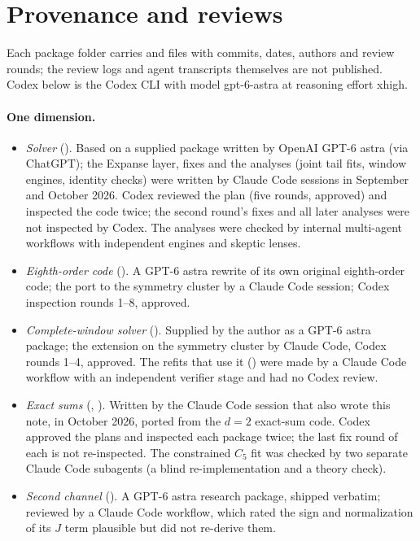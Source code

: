 \section{Provenance and reviews}\label{htp:sec:provenance}
Each package folder carries  and  files with commits, dates, authors and review rounds;
the review logs and agent transcripts themselves are not published. Codex below is the Codex CLI with model
gpt-6-astra at reasoning effort xhigh.

\paragraph{One dimension.}
\begin{itemize}
\item \emph{Solver} (). Based on a supplied package written by OpenAI GPT-6 astra (via
 ChatGPT); the Expanse layer, fixes and the analyses (joint tail fits, window engines, identity checks) were written by
 Claude Code sessions in September and October 2026. Codex reviewed the plan (five rounds, approved) and inspected the
 code twice; the second round's fixes and all later analyses were not inspected by Codex. The analyses were checked by
 internal multi-agent workflows with independent engines and skeptic lenses.
\item \emph{Eighth-order code} (). A GPT-6 astra rewrite of its own original eighth-order code; the
 port to the symmetry cluster by a Claude Code session; Codex inspection rounds 1--8, approved.
\item \emph{Complete-window solver} (). Supplied by the author as a GPT-6 astra
 package; the extension on the symmetry cluster by Claude Code, Codex rounds 1--4, approved. The refits that use it
 () were made by a Claude Code workflow with an independent verifier stage and had no Codex
 review.
\item \emph{Exact sums} (, ). Written by the Claude Code session that
 also wrote this note, in October 2026, ported from the $d=2$ exact-sum code. Codex approved the plans and inspected each
 package twice; the last fix round of each is not re-inspected. The constrained $C_5$ fit was checked by two separate
 Claude Code subagents (a blind re-implementation and a theory check).
\item \emph{Second channel} (). A GPT-6 astra research package, shipped
 verbatim; reviewed by a Claude Code workflow, which rated the sign and normalization of its $J$ term plausible but did
 not re-derive them.
\end{itemize}

